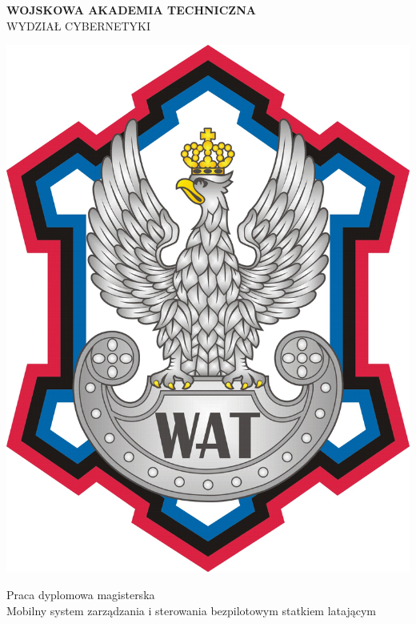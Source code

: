 \documentclass[12pt, a4paper, twoside]{report}
\begin{document}
\begin{titlepage}
\begin{center} %
\Large \textbf{WOJSKOWA AKADEMIA TECHNICZNA}\\[1mm]
\Large {WYDZIAŁ CYBERNETYKI}\\[1mm]
\end{center}

\vspace{0.5cm}
\begin{center}
	\includegraphics[scale= 0.3]{Obrazy/Logo_WAT.jpg} %
\end{center}
\begin{center}
	\Huge {Praca dyplomowa magisterska} \\
	\vspace{0.5cm}
	Mobilny system zarządzania i sterowania bezpilotowym statkiem latającym
\end{center}


\end{titlepage}
\end{document}
